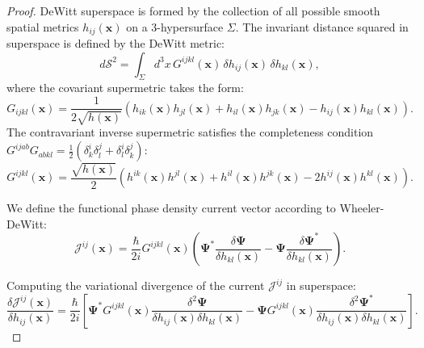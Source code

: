 \documentclass[11pt,a4paper]{article}
\theoremstyle{definition}
\begin{document}
\begin{proof}
DeWitt superspace is formed by the collection of all possible smooth spatial metrics $h_{ij}(\mathbf{x})$ on a 3-hypersurface $\Sigma$. The invariant distance squared in superspace is defined by the DeWitt metric:
\begin{equation}\label{eq:1.93}\tag{1.93}
d\mathcal{S}^2 = \int_\Sigma d^3x \, G^{ijkl}(\mathbf{x}) \, \delta h_{ij}(\mathbf{x}) \, \delta h_{kl}(\mathbf{x}),
\end{equation}
where the covariant supermetric takes the form:
\begin{equation}\label{eq:1.94}\tag{1.94}
G_{ijkl}(\mathbf{x}) = \frac{1}{2\sqrt{h(\mathbf{x})}} \left( h_{ik}(\mathbf{x}) h_{jl}(\mathbf{x}) + h_{il}(\mathbf{x}) h_{jk}(\mathbf{x}) - h_{ij}(\mathbf{x}) h_{kl}(\mathbf{x}) \right).
\end{equation}
The contravariant inverse supermetric satisfies the completeness condition $G^{ijab} G_{abkl} = \frac{1}{2}(\delta^i_k \delta^j_l + \delta^i_l \delta^j_k)$:
\begin{equation}\label{eq:1.95}\tag{1.95}
G^{ijkl}(\mathbf{x}) = \frac{\sqrt{h(\mathbf{x})}}{2} \left( h^{ik}(\mathbf{x}) h^{jl}(\mathbf{x}) + h^{il}(\mathbf{x}) h^{jk}(\mathbf{x}) - 2 h^{ij}(\mathbf{x}) h^{kl}(\mathbf{x}) \right).
\end{equation}

We define the functional phase density current vector according to Wheeler-DeWitt:
\begin{equation}\label{eq:1.96}\tag{1.96}
\mathcal{J}^{ij}(\mathbf{x}) = \frac{\hbar}{2i} G^{ijkl}(\mathbf{x}) \left( \mathbf{\Psi}^* \frac{\delta \mathbf{\Psi}}{\delta h_{kl}(\mathbf{x})} - \mathbf{\Psi} \frac{\delta \mathbf{\Psi}^*}{\delta h_{kl}(\mathbf{x})} \right).
\end{equation}

Computing the variational divergence of the current $\mathcal{J}^{ij}$ in superspace:
\begin{equation}\label{eq:1.97}\tag{1.97}
\frac{\delta \mathcal{J}^{ij}(\mathbf{x})}{\delta h_{ij}(\mathbf{x})} = \frac{\hbar}{2i} \left[ \mathbf{\Psi}^* G^{ijkl}(\mathbf{x}) \frac{\delta^2 \mathbf{\Psi}}{\delta h_{ij}(\mathbf{x}) \delta h_{kl}(\mathbf{x})} - \mathbf{\Psi} G^{ijkl}(\mathbf{x}) \frac{\delta^2 \mathbf{\Psi}^*}{\delta h_{ij}(\mathbf{x}) \delta h_{kl}(\mathbf{x})} \right].
\end{equation}


\end{proof}
\end{document}
